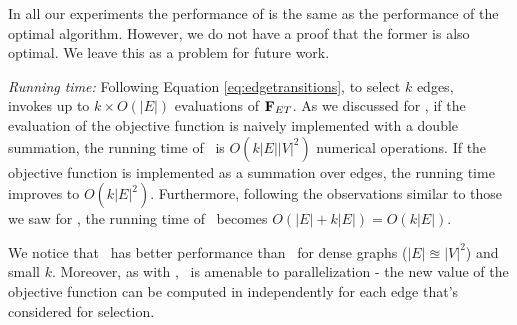 
In all our experiments the performance of {\edgegreedy} is the same as the performance of
the optimal {\edgeDP} algorithm. However, we do not have a proof that the former is also optimal. We leave this as a problem for future work.

\emph{Running time:} Following Equation \eqref{eq:edgetransitions},
to select $k$ edges,
\edgegreedy\ %
invokes up to $k\times O(|E|)$ evaluations of
$\mathbf{F}_{{\sc ET}}$.
As we discussed for \nodegreedy, if the evaluation of the 
objective function is naively implemented with a double summation,
the running time of \edgegreedy\ is 
$O(k|E||V|^2)$ numerical operations.
If the objective function is implemented as a summation over edges,
the running time improves to $O(k|E|^2)$.
Furthermore, following the observations similar to those we saw for {\nodegreedy}, the
running time of \edgegreedy\ becomes $O(|E| + k|E|) = O(k|E|)$.

We notice that \edgeDP\ has better
performance than \edgegreedy\ for dense graphs ($|E|\approxeq |V|^2$) 
and small $k$. Moreover, as with \nodegreedy, \edgegreedy\ is 
amenable to parallelization - the new value of the objective function
can be computed in independently for each edge that's considered for
selection.





